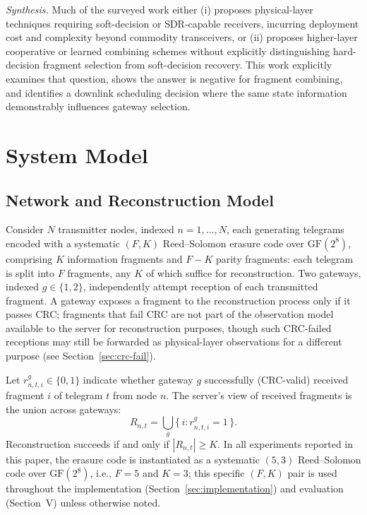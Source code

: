 \documentclass[journal]{IEEEtran}
\begin{document}
\textit{Synthesis.} Much of the surveyed work either (i) proposes physical-layer techniques requiring soft-decision or SDR-capable receivers, incurring deployment cost and complexity beyond commodity transceivers, or (ii) proposes higher-layer cooperative or learned combining schemes without explicitly distinguishing hard-decision fragment selection from soft-decision recovery. This work explicitly examines that question, shows the answer is negative for fragment combining, and identifies a downlink scheduling decision where the same state information demonstrably influences gateway selection.

\section{System Model}

\subsection{Network and Reconstruction Model}
Consider $N$ transmitter nodes, indexed $n = 1, \ldots, N$, each generating telegrams encoded with a systematic $(F, K)$ Reed--Solomon erasure code over $\mathrm{GF}(2^8)$, comprising $K$ information fragments and $F-K$ parity fragments: each telegram is split into $F$ fragments, any $K$ of which suffice for reconstruction. Two gateways, indexed $g \in \{1, 2\}$, independently attempt reception of each transmitted fragment. A gateway exposes a fragment to the reconstruction process only if it passes CRC; fragments that fail CRC are not part of the observation model available to the server for reconstruction purposes, though such CRC-failed receptions may still be forwarded as physical-layer observations for a different purpose (see Section~\ref{sec:crc-fail}).

Let $r^g_{n,t,i} \in \{0,1\}$ indicate whether gateway $g$ successfully (CRC-valid) received fragment $i$ of telegram $t$ from node $n$. The server's view of received fragments is the union across gateways:
\begin{equation}
R_{n,t} = \bigcup_{g} \{\, i : r^g_{n,t,i} = 1 \,\}.
\end{equation}
Reconstruction succeeds if and only if $|R_{n,t}| \geq K$. In all experiments reported in this paper, the erasure code is instantiated as a systematic $(5,3)$ Reed--Solomon code over $\mathrm{GF}(2^8)$, i.e., $F=5$ and $K=3$; this specific $(F,K)$ pair is used throughout the implementation (Section~\ref{sec:implementation}) and evaluation (Section~V) unless otherwise noted.
\end{document}
